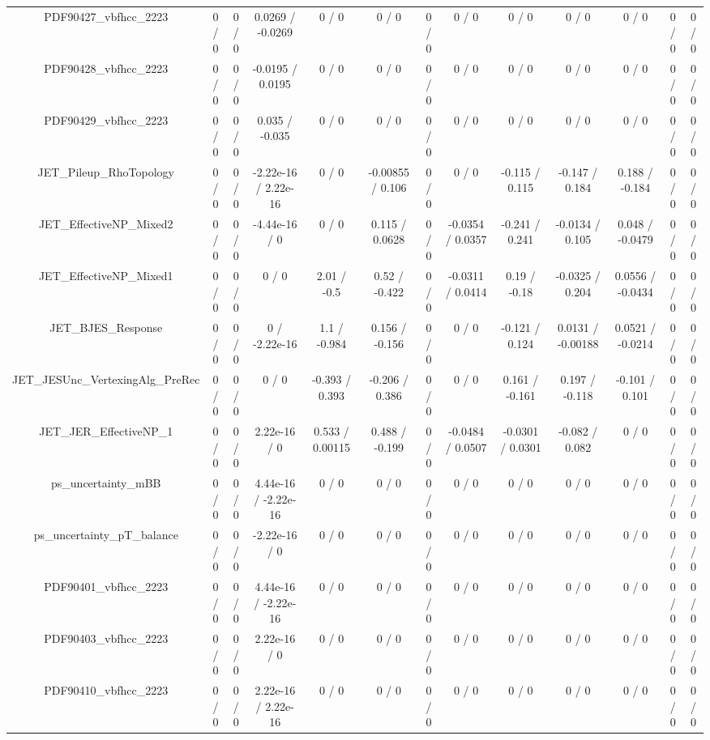\documentclass[10pt]{article}
\begin{document}
\begin{table}[htbp]
\begin{center}
\begin{tabular}{|c|c|c|c|c|c|c|c|c|c|c|c|c|}
  PDF90427_vbfhcc_2223 & 0 / 0 & 0 / 0 & 0.0269 / -0.0269 & 0 / 0 & 0 / 0 & 0 / 0 & 0 / 0 & 0 / 0 & 0 / 0 & 0 / 0 & 0 / 0 & 0 / 0 \\ 
  PDF90428_vbfhcc_2223 & 0 / 0 & 0 / 0 & -0.0195 / 0.0195 & 0 / 0 & 0 / 0 & 0 / 0 & 0 / 0 & 0 / 0 & 0 / 0 & 0 / 0 & 0 / 0 & 0 / 0 \\ 
  PDF90429_vbfhcc_2223 & 0 / 0 & 0 / 0 & 0.035 / -0.035 & 0 / 0 & 0 / 0 & 0 / 0 & 0 / 0 & 0 / 0 & 0 / 0 & 0 / 0 & 0 / 0 & 0 / 0 \\ 
  JET_Pileup_RhoTopology & 0 / 0 & 0 / 0 & -2.22e-16 / 2.22e-16 & 0 / 0 & -0.00855 / 0.106 & 0 / 0 & 0 / 0 & -0.115 / 0.115 & -0.147 / 0.184 & 0.188 / -0.184 & 0 / 0 & 0 / 0 \\ 
  JET_EffectiveNP_Mixed2 & 0 / 0 & 0 / 0 & -4.44e-16 / 0 & 0 / 0 & 0.115 / 0.0628 & 0 / 0 & -0.0354 / 0.0357 & -0.241 / 0.241 & -0.0134 / 0.105 & 0.048 / -0.0479 & 0 / 0 & 0 / 0 \\ 
  JET_EffectiveNP_Mixed1 & 0 / 0 & 0 / 0 & 0 / 0 & 2.01 / -0.5 & 0.52 / -0.422 & 0 / 0 & -0.0311 / 0.0414 & 0.19 / -0.18 & -0.0325 / 0.204 & 0.0556 / -0.0434 & 0 / 0 & 0 / 0 \\ 
  JET_BJES_Response & 0 / 0 & 0 / 0 & 0 / -2.22e-16 & 1.1 / -0.984 & 0.156 / -0.156 & 0 / 0 & 0 / 0 & -0.121 / 0.124 & 0.0131 / -0.00188 & 0.0521 / -0.0214 & 0 / 0 & 0 / 0 \\ 
  JET_JESUnc_VertexingAlg_PreRec & 0 / 0 & 0 / 0 & 0 / 0 & -0.393 / 0.393 & -0.206 / 0.386 & 0 / 0 & 0 / 0 & 0.161 / -0.161 & 0.197 / -0.118 & -0.101 / 0.101 & 0 / 0 & 0 / 0 \\ 
  JET_JER_EffectiveNP_1 & 0 / 0 & 0 / 0 & 2.22e-16 / 0 & 0.533 / 0.00115 & 0.488 / -0.199 & 0 / 0 & -0.0484 / 0.0507 & -0.0301 / 0.0301 & -0.082 / 0.082 & 0 / 0 & 0 / 0 & 0 / 0 \\ 
  ps_uncertainty_mBB & 0 / 0 & 0 / 0 & 4.44e-16 / -2.22e-16 & 0 / 0 & 0 / 0 & 0 / 0 & 0 / 0 & 0 / 0 & 0 / 0 & 0 / 0 & 0 / 0 & 0 / 0 \\ 
  ps_uncertainty_pT_balance & 0 / 0 & 0 / 0 & -2.22e-16 / 0 & 0 / 0 & 0 / 0 & 0 / 0 & 0 / 0 & 0 / 0 & 0 / 0 & 0 / 0 & 0 / 0 & 0 / 0 \\ 
  PDF90401_vbfhcc_2223 & 0 / 0 & 0 / 0 & 4.44e-16 / -2.22e-16 & 0 / 0 & 0 / 0 & 0 / 0 & 0 / 0 & 0 / 0 & 0 / 0 & 0 / 0 & 0 / 0 & 0 / 0 \\ 
  PDF90403_vbfhcc_2223 & 0 / 0 & 0 / 0 & 2.22e-16 / 0 & 0 / 0 & 0 / 0 & 0 / 0 & 0 / 0 & 0 / 0 & 0 / 0 & 0 / 0 & 0 / 0 & 0 / 0 \\ 
  PDF90410_vbfhcc_2223 & 0 / 0 & 0 / 0 & 2.22e-16 / 2.22e-16 & 0 / 0 & 0 / 0 & 0 / 0 & 0 / 0 & 0 / 0 & 0 / 0 & 0 / 0 & 0 / 0 & 0 / 0 \\ 

\end{tabular}
\end{center}
\end{table}
\end{document}
